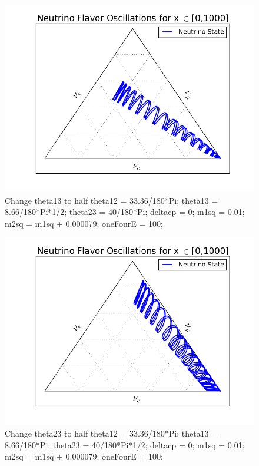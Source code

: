 \documentclass{tufte-handout}
\begin{document}
\begin{figure}
\centering
\includegraphics{assets/ternary/1000-3}
\caption{ Change theta13 to half\newline
theta12 = 33.36/180*Pi;\newline
theta13 = 8.66/180*Pi*1/2;\newline
theta23 = 40/180*Pi;\newline
deltacp = 0;\newline
m1sq = 0.01;\newline
m2sq = m1sq + 0.000079;\newline
oneFourE = 100; 
}
\end{figure}




\begin{figure}
\centering
\includegraphics{assets/ternary/1000-4}
\caption{ Change theta23 to half\newline
theta12 = 33.36/180*Pi;\newline
theta13 = 8.66/180*Pi;\newline
theta23 = 40/180*Pi*1/2;\newline
deltacp = 0;\newline
m1sq = 0.01;\newline
m2sq = m1sq + 0.000079;\newline
oneFourE = 100; 
}
\end{figure}
\end{document}
